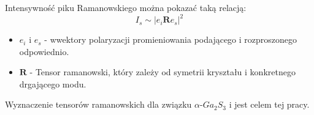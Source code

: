 Intensywność piku Ramanowskiego można pokazać taką relacją:
\begin{equation}
	I_{s} \sim |e_{i}\mathbf{R}e_{s}|^{2}
\end{equation}
\begin{itemize}
	\item $e_{i}$ i $e_{s}$ - wwektory polaryzacji promieniowania podającego i rozproszonego odpowiednio.
	\item $\mathbf{R}$ - Tensor ramanowski, który zależy od symetrii kryształu i konkretnego drgającego modu.
\end{itemize}

Wyznaczenie tensorów ramanowskich dla związku $\alpha$-$Ga_{2}S_{3}$ i jest celem tej pracy.



